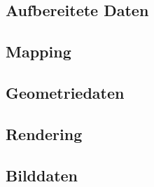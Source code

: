 \subsection{Aufbereitete Daten}

\subsection{Mapping}

\subsection{Geometriedaten}

\subsection{Rendering}

\subsection{Bilddaten}